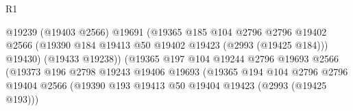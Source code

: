 \begin{lexlean}{R1}
\begin{coremodule}
                                                @19239
                                                (@19403 @2566)
                                                @19691
                                                (@19365
                                                  @185
                                                  @104
                                                  @2796
                                                  @2796
                                                  @19402
                                                  @2566
                                                  (@19390
                                                    @184
                                                    @19413
                                                    @50
                                                    @19402
                                                    @19423
                                                    (@2993 (@19425 @184)))
                                                  @19430)
                                                (@19433 @19238))
                                              (@19365
                                                @197
                                                @104
                                                @19244
                                                @2796
                                                @19693
                                                @2566
                                                (@19373
                                                  @196
                                                  @2798
                                                  @19243
                                                  @19406
                                                  @19693
                                                  (@19365
                                                    @194
                                                    @104
                                                    @2796
                                                    @2796
                                                    @19404
                                                    @2566
                                                    (@19390
                                                      @193
                                                      @19413
                                                      @50
                                                      @19404
                                                      @19423
                                                      (@2993 (@19425 @193)))

\end{coremodule}
\end{lexlean}
